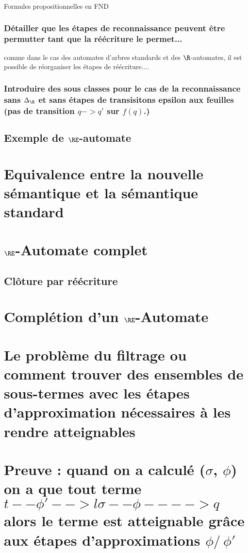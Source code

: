 {Formules propositionnelles en FND}



\subsubsection{Détailler que les étapes de reconnaissance peuvent être permutter tant que la réécriture le permet...}
comme dans le cas des automates d'arbres standards et des $\R$-automates, il est possible de réorganiser les étapes de
réécriture....

\subsubsection{Introduire des sous classes pour le cas de la reconnaissance sans $\Delta_\R$ et sans étapes de transisitons epsilon aux feuilles
  (pas de transition $q -> q'$ sur $f(q)$.)}

\subsection{Exemple de $\RE$-automate}

\section{Equivalence entre la nouvelle sémantique et la sémantique standard}
\section{$\RE$-Automate complet}
\subsection{Clôture par réécriture}


\section{Complétion d'un $\RE$-Automate}
\section{Le problème du filtrage ou comment trouver des ensembles de sous-termes avec les étapes d'approximation nécessaires à les rendre atteignables}
\section{Preuve : quand on a calculé ($\sigma$, $\phi$) on a que tout terme $t --\phi'--> l\sigma --\phi ----> q$ alors le terme est atteignable grâce aux étapes d'approximations $\phi /\ \phi'$}
